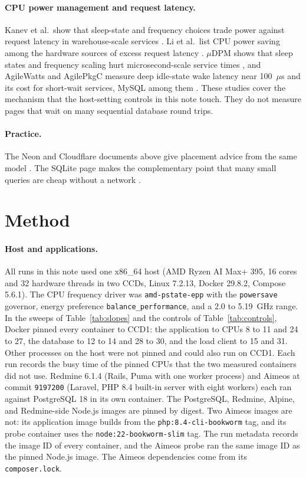 \documentclass[11pt]{article}
\begin{document}
\paragraph{CPU power management and request latency.} Kanev et al.\ show that sleep-state and
frequency choices trade power against request latency in warehouse-scale services
\citep{kanev2014tradeoffs}. Li et al.\ list CPU power saving among the hardware sources of
excess request latency \citep{li2014tales}. $\mu$DPM shows that sleep states and frequency
scaling hurt microsecond-scale service times \citep{chou2019udpm}, and AgileWatts and
AgilePkgC measure deep idle-state wake latency near 100~$\mu$s and its cost for short-wait
services, MySQL among them \citep{hajyahya2022agilewatts,antoniou2022agilepkgc}. These studies
cover the mechanism that the host-setting controls in this note touch. They do not measure
pages that wait on many sequential database round trips.

\paragraph{Practice.} The Neon and Cloudflare documents above give placement advice from the
same model \citep{neon2026latency,cloudflare2026placement}. The SQLite page makes the
complementary point that many small queries are cheap without a network
\citep{sqlite2026smallqueries}.

\section{Method}

\paragraph{Host and applications.} All runs in this note used one x86\_64 host (AMD Ryzen AI
Max+ 395, 16 cores and 32 hardware threads in two CCDs, Linux 7.2.13, Docker 29.8.2,
Compose 5.6.1). The CPU frequency driver was \texttt{amd-pstate-epp} with the
\texttt{powersave} governor, energy preference \texttt{balance\_performance}, and a 2.0 to
5.19~GHz range. In the sweeps of Table~\ref{tab:slopes} and the controls of
Table~\ref{tab:controls}, Docker pinned every container to CCD1: the application to CPUs 8 to 11
and 24 to 27, the database to 12 to 14 and 28 to 30, and the load client to 15 and 31. Other
processes on the host were not pinned and could also run on CCD1. Each run records the busy
time of the pinned CPUs that the two measured containers did not use. Redmine 6.1.4 (Rails, Puma with one
worker process) and Aimeos at commit \texttt{9197200} (Laravel, PHP 8.4 built-in server with
eight workers) each ran against PostgreSQL 18 in its own container. The PostgreSQL, Redmine,
Alpine, and Redmine-side Node.js images are pinned by digest. Two Aimeos images are not: its
application image builds from the \texttt{php:8.4-cli-bookworm} tag, and its probe container
uses the \texttt{node:22-bookworm-slim} tag. The run metadata records the image ID of every
container, and the Aimeos probe ran the same image ID as the pinned Node.js image. The Aimeos
dependencies come from its \texttt{composer.lock}.
\end{document}
